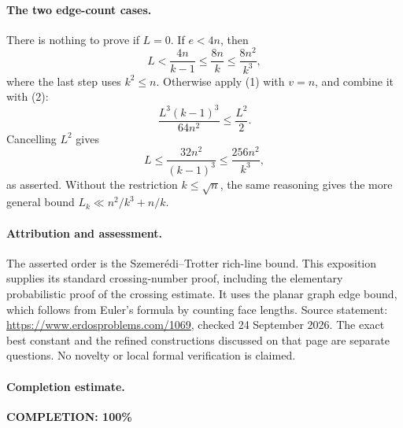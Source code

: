 \paragraph{The two edge-count cases.}
There is nothing to prove if \(L=0\). If \(e<4n\), then
\[
 L<\frac{4n}{k-1}\leq\frac{8n}{k}
 \leq\frac{8n^2}{k^3},
\]
where the last step uses \(k^2\leq n\).
Otherwise apply (1) with \(v=n\), and combine it with (2):
\[
 \frac{L^3(k-1)^3}{64n^2}\leq\frac{L^2}{2}.
\]
Cancelling \(L^2\) gives
\[
 L\leq\frac{32n^2}{(k-1)^3}
 \leq\frac{256n^2}{k^3},
\]
as asserted. Without the restriction \(k\leq\sqrt n\), the same reasoning gives the more general bound
\(L_k\ll n^2/k^3+n/k\).

\paragraph{Attribution and assessment.}
The asserted order is the Szemer\'edi--Trotter rich-line bound. This exposition supplies its standard crossing-number proof, including the elementary probabilistic proof of the crossing estimate. It uses the planar graph edge bound, which follows from Euler's formula by counting face lengths. Source statement: \url{https://www.erdosproblems.com/1069}, checked 24 September 2026. The exact best constant and the refined constructions discussed on that page are separate questions. No novelty or local formal verification is claimed.

\paragraph{Completion estimate.}
\textbf{COMPLETION: 100\%}
